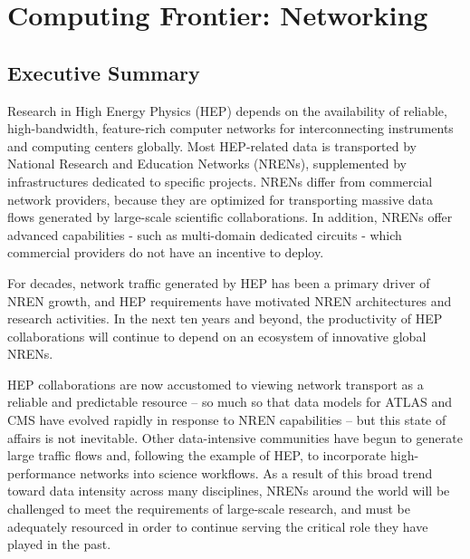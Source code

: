  
\chapter{Computing Frontier: Networking}
\label{chap:mag}


\begin{center}\begin{boldmath}



\end{boldmath}\end{center}


\section{Executive Summary}
\label{sec:comp-Exec}

Research in High Energy Physics (HEP) depends on the availability of reliable, high-bandwidth, feature-rich computer networks for interconnecting instruments and computing centers globally. Most HEP-related data is transported by National Research and Education Networks (NRENs), supplemented by infrastructures dedicated to specific projects. NRENs differ from commercial network providers, because they are optimized for transporting massive data flows generated by large-scale scientific collaborations. In addition, NRENs offer advanced capabilities - such as multi-domain dedicated circuits - which commercial providers do not have an incentive to deploy.

For decades, network traffic generated by HEP has been a primary driver of NREN growth, and HEP requirements have motivated NREN architectures and research activities. In the next ten years and beyond, the productivity of HEP collaborations will continue to depend on an ecosystem of innovative global NRENs. 

HEP collaborations are now accustomed to viewing network transport as a reliable and predictable resource – so much so that data models for ATLAS and CMS have evolved rapidly in response to NREN capabilities – but this state of affairs is not inevitable. Other data-intensive communities have begun to generate large traffic flows and, following the example of HEP, to incorporate high-performance networks into science workflows. As a result of this broad trend toward data intensity across many disciplines, NRENs around the world will be challenged to meet the requirements of large-scale research, and must be adequately resourced in order to continue serving the critical role they have played in the past.  

